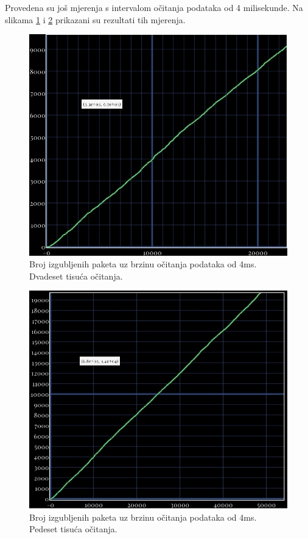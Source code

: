 \documentclass[times, utf8, diplomski]{diplomski}
\begin{document}
Provedena su još mjerenja s intervalom očitanja podataka od 4 milisekunde.
Na slikama \ref{fig:packet_loss_4_20} i \ref{fig:packet_loss_4_50} prikazani su rezultati tih mjerenja.

\begin{figure}[H]
  \includegraphics[width=\textwidth]{packets_lost_every_4ms_20k.png}
  \caption{Broj izgubljenih paketa uz brzinu očitanja podataka od 4ms. Dvadeset tisuća očitanja.}
  \label{fig:packet_loss_4_20}
\end{figure}

\begin{figure}[H]
  \includegraphics[width=\textwidth]{packets_lost_every_4ms_50k.png}
  \caption{Broj izgubljenih paketa uz brzinu očitanja podataka od 4ms. Pedeset tisuća očitanja.}
  \label{fig:packet_loss_4_50}
\end{figure}
\end{document}
